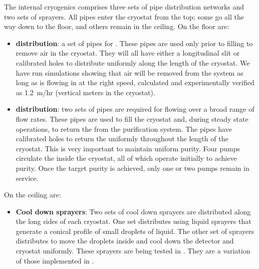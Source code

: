 \label{sec:fdsp-tc-internal-cryo}

The internal cryogenics comprises three sets of pipe distribution networks and two sets of sprayers. All pipes enter the cryostat from the top; some go all the way down to the floor, and others remain in the ceiling. On the floor are:
\begin{itemize}
\setlength\itemsep{1mm}
\setlength{\parsep}{1mm}
\setlength{\itemsep}{-5mm}
\item \textbf{ distribution}: a set of pipes %
for . These pipes are used only prior to filling %
to remove air %
in the cryostat. They will all have either a longitudinal slit or calibrated holes to distribute  uniformly along the length of the cryostat. 
We have run  simulations showing that air will be removed from the system as long as  is flowing in at the right speed, calculated and experimentally verified as \SI{1.2}{m/hr} (vertical meters in the cryostat).  


\item \textbf{ distribution}: two sets of pipes are required for flowing 
 over a broad  range of flow rates. These pipes are used to fill the cryostat and, during steady state operations, to return the  from the purification system. The pipes have calibrated holes to return the  uniformly throughout the length of the cryostat. This is very important %
to maintain uniform purity. Four pumps circulate the  inside the cryostat, all of which operate %
initially to achieve purity. %
Once the target purity is achieved, only one or two pumps remain in service. %
\end{itemize}

On the ceiling are:

\begin{itemize}
\setlength\itemsep{1mm}
\setlength{\parsep}{1mm}
\setlength{\itemsep}{-5mm}
\item \textbf{Cool down sprayers}: Two sets of cool down sprayers are distributed along the long sides of each cryostat. One set distributes  using liquid sprayers that generate a conical profile of small droplets of liquid. The other set of sprayers distributes  to move the  droplets inside and cool down the detector and cryostat uniformly. These sprayers are being tested in . They are a variation of those implemented in .
\end{itemize}

